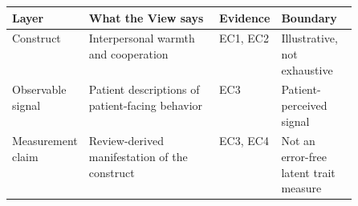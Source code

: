\begin{tabularx}{\linewidth}{@{}p{0.16\linewidth}X p{0.12\linewidth}p{0.22\linewidth}@{}}
\toprule
Layer & What the View says & Evidence & Boundary \\
\midrule
Construct & Interpersonal warmth and cooperation & EC1, EC2 & Illustrative, not exhaustive \\
Observable signal & Patient descriptions of patient-facing behavior & EC3 & Patient-perceived signal \\
Measurement claim & Review-derived manifestation of the construct & EC3, EC4 & Not an error-free latent trait measure \\
\bottomrule
\end{tabularx}
